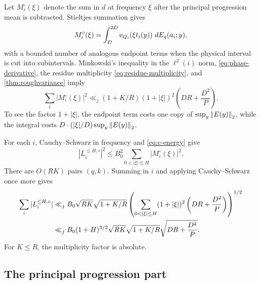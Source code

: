 Let $M_i^\circ(\xi)$ denote the sum in $d$ at frequency $\xi$ after the
principal progression mean is subtracted.  Stieltjes summation gives
\begin{equation}\label{eq:stieltjes}
 M_i^\circ(\xi)
   =\int_D^{2D}\mathrm e_{Q_i}\!\left(\xi t_i(y)\right)\,dE_q(a_i;y),
\end{equation}
with a bounded number of analogous endpoint terms when the physical interval is
cut into subintervals.  Minkowski's inequality in the $\ell^2(i)$ norm,
\cref{eq:phase-derivative}, the residue multiplicity
\cref{eq:residue-multiplicity}, and \cref{thm:roughvariance} imply
\begin{equation}\label{eq:Mxi-l2}
 \sum_i|M_i^\circ(\xi)|^2
 \ll_j (1+K/R)(1+|\xi|)^2
             \left(DR+\frac{D^2}{P}\right).
\end{equation}
To see the factor $1+|\xi|$, the endpoint term costs one copy of
$\sup_y\left\lVert E(y)\right\rVert_2$, while the integral costs
$D\cdot(|\xi|/D)\sup_y\left\lVert E(y)\right\rVert_2$.

For each $i$, Cauchy--Schwarz in frequency and \cref{eq:c-energy} give
\[
 |L_i^{\le H,\circ}|^2
 \le B_0^2\sum_{0<|\xi|\le H}|M_i^\circ(\xi)|^2.
\]
There are $O(RK)$ pairs $(q,k)$.  Summing in $i$ and applying Cauchy--Schwarz
once more gives
\begin{align}
 \sum_i|L_i^{\le H,\circ}|
 &\ll_j B_0\sqrt{RK}\sqrt{1+K/R}
 \left(
   \sum_{0<|\xi|\le H}(1+|\xi|)^2
   \left(DR+\frac{D^2}{P}\right)
 \right)^{1/2}\notag\\
 &\ll_j B_0(1+H)^{3/2}\sqrt{RK}\sqrt{1+K/R}
          \sqrt{DR+\frac{D^2}{P}}.
 \label{eq:nonprincipal-transfer}
\end{align}
For $K\le R$, the multiplicity factor is absolute.

\subsection{The principal progression part}

